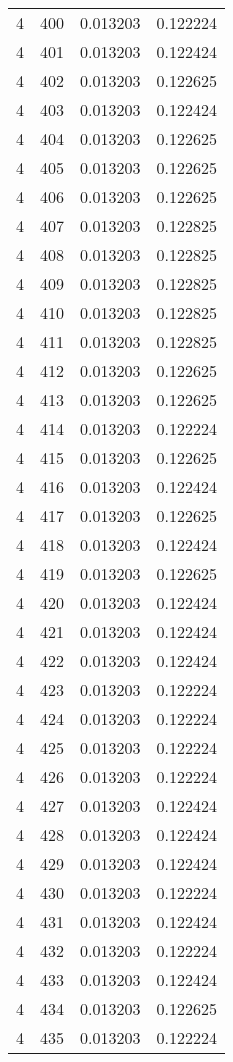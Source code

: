 \begin{longtable}{rrrr}
4 & 400 & 0.013203 & 0.122224 \\
4 & 401 & 0.013203 & 0.122424 \\
4 & 402 & 0.013203 & 0.122625 \\
4 & 403 & 0.013203 & 0.122424 \\
4 & 404 & 0.013203 & 0.122625 \\
4 & 405 & 0.013203 & 0.122625 \\
4 & 406 & 0.013203 & 0.122625 \\
4 & 407 & 0.013203 & 0.122825 \\
4 & 408 & 0.013203 & 0.122825 \\
4 & 409 & 0.013203 & 0.122825 \\
4 & 410 & 0.013203 & 0.122825 \\
4 & 411 & 0.013203 & 0.122825 \\
4 & 412 & 0.013203 & 0.122625 \\
4 & 413 & 0.013203 & 0.122625 \\
4 & 414 & 0.013203 & 0.122224 \\
4 & 415 & 0.013203 & 0.122625 \\
4 & 416 & 0.013203 & 0.122424 \\
4 & 417 & 0.013203 & 0.122625 \\
4 & 418 & 0.013203 & 0.122424 \\
4 & 419 & 0.013203 & 0.122625 \\
4 & 420 & 0.013203 & 0.122424 \\
4 & 421 & 0.013203 & 0.122424 \\
4 & 422 & 0.013203 & 0.122424 \\
4 & 423 & 0.013203 & 0.122224 \\
4 & 424 & 0.013203 & 0.122224 \\
4 & 425 & 0.013203 & 0.122224 \\
4 & 426 & 0.013203 & 0.122224 \\
4 & 427 & 0.013203 & 0.122424 \\
4 & 428 & 0.013203 & 0.122424 \\
4 & 429 & 0.013203 & 0.122424 \\
4 & 430 & 0.013203 & 0.122224 \\
4 & 431 & 0.013203 & 0.122424 \\
4 & 432 & 0.013203 & 0.122224 \\
4 & 433 & 0.013203 & 0.122424 \\
4 & 434 & 0.013203 & 0.122625 \\
4 & 435 & 0.013203 & 0.122224 \\

\end{longtable}

